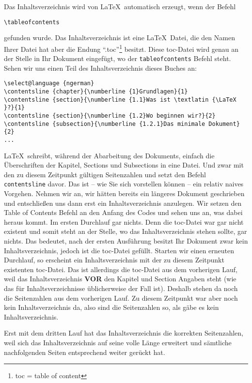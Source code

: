 Das Inhaltsverzeichnis wird von \LaTeX\ automatisch erzeugt, wenn der Befehl 
\begin{verbatim}
\tableofcontents
\end{verbatim}
gefunden wurde. Das Inhaltsverzeichnis ist eine \LaTeX\ Datei, die den Namen Ihrer Datei hat aber die Endung "`.toc"'\footnote{toc = table of content} besitzt. Diese toc-Datei wird genau an der Stelle in Ihr Dokument eingefügt, wo der \texttt{tableofcontents} Befehl steht. Sehen wir uns einen Teil des Inhaltsverzeichnis dieses Buches an:

\footnotesize
\begin{verbatim}
\select@language {ngerman}
\contentsline {chapter}{\numberline {1}Grundlagen}{1}
\contentsline {section}{\numberline {1.1}Was ist \textlatin {\LaTeX }?}{1}
\contentsline {section}{\numberline {1.2}Wo beginnen wir?}{2}
\contentsline {subsection}{\numberline {1.2.1}Das minimale Dokument}{2}
...
\end{verbatim}
\normalsize

\LaTeX\ schreibt, während der Abarbeitung des Dokuments, einfach die Überschriften der Kapitel, Sections und Subsections in eine Datei. Und zwar mit den zu diesem Zeitpunkt gültigen Seitenzahlen und setzt den Befehl \texttt{contentsline} davor. Das ist -- wie Sie sich vorstellen können -- ein relativ naives Vorgehen. Nehmen wir an, wir hätten bereits ein längeres Dokument geschrieben und entschließen uns dann erst ein Inhaltsverzeichnis anzulegen. Wir setzen den Table of Contents Befehl an den Anfang des Codes und sehen uns an, was dabei heraus kommt. Im ersten Durchlauf gar nichts. Denn die toc-Datei war gar nicht existent und somit steht an der Stelle, wo das Inhaltsverzeichnis stehen sollte, gar nichts. Das bedeutet, nach der ersten Ausführung besitzt Ihr Dokument zwar kein Inhaltsverzeichnis, jedoch ist die toc-Datei gefüllt. Starten wir einen erneuten Durchlauf, so erscheint ein Inhaltsverzeichnis mit der zu diesem Zeitpunkt existenten toc-Datei. Das ist allerdings die toc-Datei aus dem vorherigen Lauf, weil das Inhaltsverzeichnis  \textbf{VOR} den Kapitel und Section Angaben steht (wie das für Inhaltsverzeichnisse üblicherweise der Fall ist). Deshalb stehen da noch die Seitenzahlen aus dem vorherigen Lauf. Zu diesem Zeitpunkt war aber noch kein Inhaltsverzeichnis da, also sind die Seitenzahlen so, als gäbe es kein Inhaltsverzeichnis.

Erst mit dem dritten Lauf hat das Inhaltsverzeichnis die korrekten Seitenzahlen, weil sich das Inhaltsverzeichnis auf seine volle Länge erweitert und sämtliche nachfolgenden Seiten entsprechend weiter gerückt hat.

